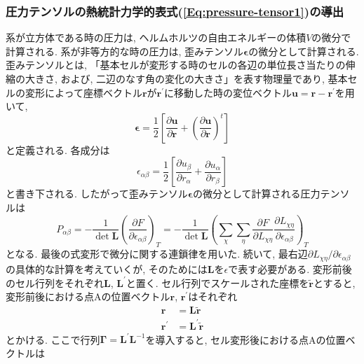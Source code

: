 \subsubsection{圧力テンソルの熱統計力学的表式(\ref{Eq:pressure-tensor1})の導出}

系が立方体である時の圧力は, ヘルムホルツの自由エネルギーの体積$V$の微分で計算される. 
系が非等方的な時の圧力は, 歪みテンソル$\bm{\epsilon}$の微分として計算される. 
歪みテンソルとは, 「基本セルが変形する時のセルの各辺の単位長さ当たりの伸縮の大きさ, および, 二辺のなす角の変化の大きさ」を表す物理量であり, 基本セルの変形によって座標ベクトル$\bm{r}$が$\bm{r}^{\prime}$に移動した時の変位ベクトル$\bm{u} = \bm{r} - \bm{r}^{\prime}$を用いて, 
\begin{equation}
  \bm{\epsilon}
  =
  \frac{1}{2}
  \left[
    \frac{\partial \bm{u}}{\partial \bm{r}} +
    \left(\frac{\partial \bm{u}}{\partial \bm{r}}\right)^{t}
  \right]
  \label{Eq:strain-tensor1}
\end{equation}
と定義される. 各成分は
\begin{equation}
  \epsilon_{\alpha\beta}
  =
  \frac{1}{2}
  \left[
    \frac{\partial u_{\beta}}{\partial r_{\alpha}} +
    \frac{\partial u_{\alpha}}{\partial r_{\beta}}
  \right]
  \label{Eq:strain-tensor2}
\end{equation}
と書き下される. 
したがって歪みテンソル$\bm{\epsilon}$の微分として計算される圧力テンソルは
\begin{equation}
  P_{\alpha \beta}
  =
  - \frac{1}{\det \bm{L}}
  \left(
    \frac{\partial F}{\partial \epsilon_{\alpha \beta}}
  \right)_{T}
  =
  - \frac{1}{\det \bm{L}}
  \left(
    \sum_{\chi} \sum_{\eta}
    \frac{\partial F}{\partial L_{\chi \eta}}
    \frac{\partial L_{\chi \eta}}{\partial \epsilon_{\alpha \beta}}
  \right)_{T}
  \label{Eq:pressure-tensor2}
\end{equation}
となる. 最後の式変形で微分に関する連鎖律を用いた. 
続いて, 最右辺$\partial L_{\chi \eta}/\partial \epsilon_{\alpha \beta}$の具体的な計算を考えていくが, そのためには$\bm{L}$を$\epsilon$で表す必要がある.
変形前後のセル行列をそれぞれ$\bm{L}$, $\bm{L}^{\prime}$と置く. 
セル行列でスケールされた座標を$\tilde{\bm{r}}$とすると, 変形前後における点Aの位置ベクトル$\bm{r}$, $\bm{r}^{\prime}$はそれぞれ
\begin{align}
  \bm{r} &= \bm{L} \tilde{\bm{r}} \\
  \bm{r}^{\prime} &= \bm{L}^{\prime} \tilde{\bm{r}}
\end{align}
とかける.
ここで行列$\bm{\Gamma} = \bm{L}^{\prime} \bm{L}^{-1}$を導入すると, セル変形後における点Aの位置ベクトルは
